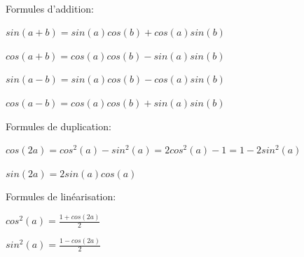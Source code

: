\documentclass[a4paper,11pt]{article}
\theoremstyle{break}
\begin{document}
\begin{theorem}
~

 Formules d'addition:
 
 $sin(a+b)=sin(a)cos(b)+cos(a)sin(b)$
 
 $cos(a+b)=cos(a)cos(b)-sin(a)sin(b)$
 
 $sin(a-b)=sin(a)cos(b)-cos(a)sin(b)$
  
 $cos(a-b)=cos(a)cos(b)+sin(a)sin(b)$
 \vspace{0.5cm}
 
 Formules de duplication:
 
 $cos(2a)=cos^2(a)-sin^2(a)=2cos^2(a)-1=1-2sin^2(a)$
 
 $sin(2a)=2sin(a)cos(a)$
 \vspace{0.5cm}
 
 Formules de linéarisation:
  
 $cos^2(a)=\frac{1+cos(2a)}{2}$
 
 $sin^2(a)=\frac{1-cos(2a)}{2}$
\end{theorem}
   
\end{document}
